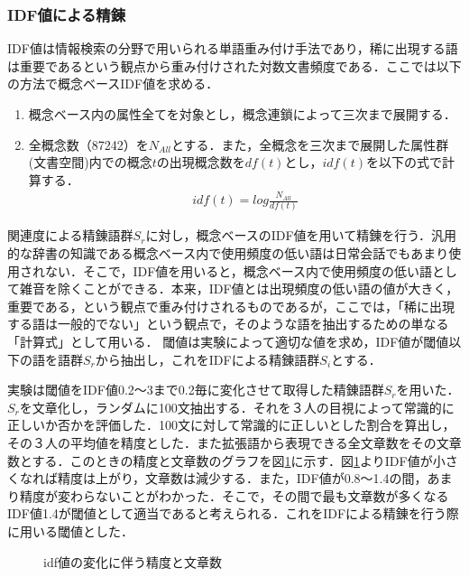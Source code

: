 \subsubsection{IDF値による精錬}
IDF値は情報検索の分野で用いられる単語重み付け手法であり，稀に出現する語は重要であるという観点から重み付けされた対数文書頻度である．ここでは以下の方法で概念ベースIDF値を求める．
\begin{enumerate}
	\item 概念ベース内の属性全てを対象とし，概念連鎖によって三次まで展開する．
	\item 全概念数（87242）を$N_{All}$とする．また，全概念を三次まで展開した属性群(文書空間)内での概念$t$の出現概念数を$df(t)$とし，$idf(t)$を以下の式で計算する．
		\begin{eqnarray}
		idf(t)=log\frac{N_{All}}{df(t)}
		\end{eqnarray}
\end{enumerate}


関連度による精錬語群$S_r$に対し，概念ベースのIDF値を用いて精錬を行う．汎用的な辞書の知識である概念ベース内で使用頻度の低い語は日常会話でもあまり使用されない．そこで，IDF値を用いると，概念ベース内で使用頻度の低い語として雑音を除くことができる．本来，IDF値とは出現頻度の低い語の値が大きく，重要である，という観点で重み付けされるものであるが，ここでは，「稀に出現する語は一般的でない」という観点で，そのような語を抽出するための単なる「計算式」として用いる．
閾値は実験によって適切な値を求め，IDF値が閾値以下の語を語群$S_r$から抽出し，これをIDFによる精錬語群$S_i$とする．

実験は閾値をIDF値0.2〜3まで0.2毎に変化させて取得した精錬語群$S_r$を用いた．$S_r$を文章化し，ランダムに100文抽出する．それを３人の目視によって常識的に正しいか否かを評価した．100文に対して常識的に正しいとした割合を算出し，その３人の平均値を精度とした．また拡張語から表現できる全文章数をその文章数とする．このときの精度と文章数のグラフを図\ref{fig:idfResult}に示す．図\ref{fig:idfResult}よりIDF値が小さくなれば精度は上がり，文章数は減少する．また，IDF値が0.8〜1.4の間，あまり精度が変わらないことがわかった．そこで，その間で最も文章数が多くなるIDF値1.4が閾値として適当であると考えられる．これをIDFによる精錬を行う際に用いる閾値とした．
\begin{figure}[htbp]
	\begin{center}
	  	\epsfxsize=10cm
		\caption{idf値の変化に伴う精度と文章数}
		\label{fig:idfResult}
	\end{center}
\end{figure}
